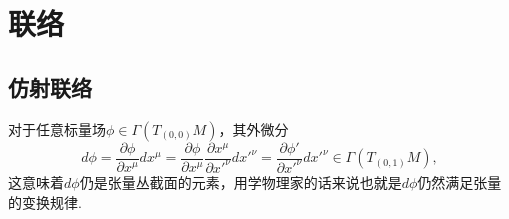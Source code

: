 \section{联络}
	\subsection{仿射联络}
		对于任意标量场$\phi\in \varGamma(T_{(0,0)}M)$，其外微分
		\begin{equation}
				 d\phi=\frac{\partial\phi}{\partial x^\mu}dx^\mu=\frac{\partial\phi}{\partial {x}^\mu}\frac{\partial{x}^\mu}{\partial {x'}^\nu}d{x'}^\nu=\frac{\partial{\phi'}}{\partial {x'}^\nu}d{x'}^\nu\in \varGamma(T_{(0,1)}M),
		\end{equation}
		这意味着$d\phi$仍是张量丛截面的元素，用学物理家的话来说也就是$d\phi$仍然满足张量的变换规律.
		
